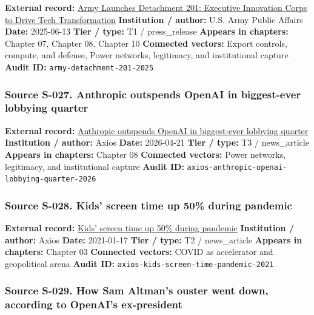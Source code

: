 \documentclass[
  american,
  11pt,
  letterpaper,
]{article}
\begin{document}
\textbf{External record:}
\href{https://www.army.mil/article/286317/army_launches_detachment_201_executive_innovation_corps_to_drive_tech_transformation}{Army
Launches Detachment 201: Executive Innovation Corps to Drive Tech
Transformation} \textbf{Institution / author:} U.S. Army Public Affairs
\textbf{Date:} 2025-06-13 \textbf{Tier / type:} T1 / press\_release
\textbf{Appears in chapters:} Chapter 07, Chapter 08, Chapter 10
\textbf{Connected vectors:} Export controls, compute, and defense, Power
networks, legitimacy, and institutional capture \textbf{Audit ID:}
\texttt{army-detachment-201-2025}

\subsubsection{Source S-027. Anthropic outspends OpenAI in biggest-ever
lobbying
quarter}\label{source-s-027-anthropic-outspends-openai-in-biggest-ever-lobbying-quarter}

\textbf{External record:}
\href{https://www.axios.com/2026/04/21/anthropic-outspends-openai-biggest-lobbying-quarter}{Anthropic
outspends OpenAI in biggest-ever lobbying quarter} \textbf{Institution /
author:} Axios \textbf{Date:} 2026-04-21 \textbf{Tier / type:} T3 /
news\_article \textbf{Appears in chapters:} Chapter 08 \textbf{Connected
vectors:} Power networks, legitimacy, and institutional capture
\textbf{Audit ID:} \texttt{axios-anthropic-openai-lobbying-quarter-2026}

\subsubsection{Source S-028. Kids' screen time up 50\% during
pandemic}\label{source-s-028-kids-screen-time-up-50-during-pandemic}

\textbf{External record:}
\href{https://www.axios.com/2021/01/17/kids-screen-time-pandemic}{Kids'
screen time up 50\% during pandemic} \textbf{Institution / author:}
Axios \textbf{Date:} 2021-01-17 \textbf{Tier / type:} T2 / news\_article
\textbf{Appears in chapters:} Chapter 03 \textbf{Connected vectors:}
COVID as accelerator and geopolitical arena \textbf{Audit ID:}
\texttt{axios-kids-screen-time-pandemic-2021}

\subsubsection{Source S-029. How Sam Altman's ouster went down,
according to OpenAI's
ex-president}\label{source-s-029-how-sam-altman-s-ouster-went-down-according-to-openai-s-ex-president}
\end{document}
